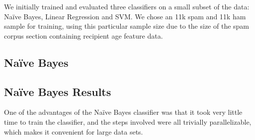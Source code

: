 \documentclass[preprint]{acm_proc_article-sp}
\begin{document}
We initially trained and evaluated three classifiers on a small subset of the data: Na\"ive Bayes, Linear Regression and SVM. 
We chose an 11k spam and 11k ham sample for training, using this particular sample size due to the size of the spam corpus 
section containing recipient age feature data.  

%
%
%
%

\subsection{Na\"ive Bayes}

%
%

\subsection{Na\"ive Bayes Results}


One of the advantages of the Na\"ive Bayes classifier was that it took very little time to train the classifier, 
and the steps involved were all trivially parallelizable, which makes it convenient for large data sets.
\end{document}
